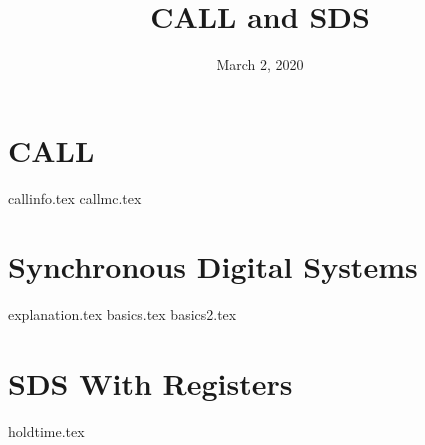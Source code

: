 \documentclass[11pt]{exam}
\title{CALL and SDS}
\date{March 2, 2020}
\begin{document}
\maketitle

\section{CALL}
\begin{questions}
{callinfo.tex}
{callmc.tex}
\end{questions}
\newpage

\section{Synchronous Digital Systems}
\begin{questions}
{explanation.tex}
{basics.tex}
{basics2.tex}
\end{questions}
\newpage

\section{SDS With Registers}
\begin{questions}
{holdtime.tex}
\end{questions}
\newpage
\end{document}
